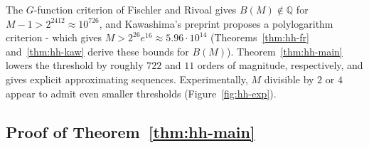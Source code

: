 \documentclass[oneside,english,11pt]{amsart}
\begin{document}
\begin{remark}\label{rem:hh-comparison}
The $G$-function criterion of Fischler and Rivoal \cite{fischler2018rational} gives $B(M)\notin\mathbb Q$ for $M-1>2^{2412}\approx10^{726}$, and Kawashima's preprint \cite{kawashima2026linear} proposes a polylogarithm criterion - which gives $M>2^{26}e^{16}\approx5.96\cdot10^{14}$ (Theorems~\ref{thm:hh-fr} and~\ref{thm:hh-kaw} derive these bounds for $B(M)$). 
Theorem~\ref{thm:hh-main} lowers the threshold by roughly $722$ and $11$ orders of magnitude, respectively, and gives explicit approximating sequences. Experimentally, $M$ divisible by $2$ or $4$ appear to admit even smaller thresholds (Figure~\ref{fig:hh-exp}).
\end{remark}

\subsection{Proof of Theorem~\ref{thm:hh-main}}\label{subsec:hh-proof}


\end{document}
